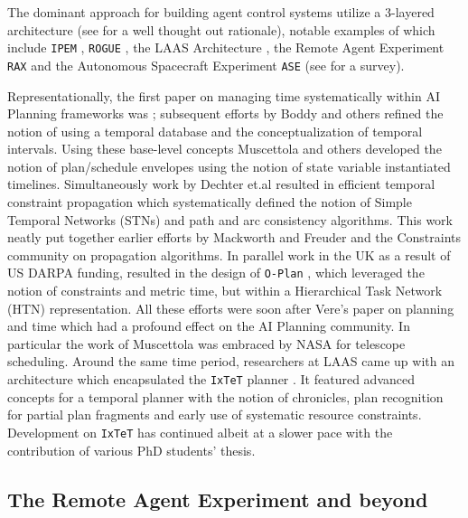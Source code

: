 The dominant approach for building agent control systems utilize a
$3$-layered architecture (see \cite{gat98} for a well thought out
rationale), notable examples of which include \texttt{IPEM}
\cite{AmbrosIngerson88}, \texttt{ROGUE} \cite{Haigh98}, the LAAS
Architecture \cite{alami:1998p820}, the Remote Agent Experiment
\texttt{RAX} \cite{mus98} and the Autonomous Spacecraft Experiment
\texttt{ASE} \cite{chien99} (see \cite{Knight01} for a survey). %

Representationally, the first paper on managing time systematically
within AI Planning frameworks was \cite{dean87}; subsequent efforts by
Boddy and others \cite{Dean88,Boddy93} refined the notion of using a
temporal database and the conceptualization of temporal
intervals. Using these base-level concepts Muscettola and others
\cite{mus92, ghallab94, laborie95, cesta96} developed the notion of
plan/schedule envelopes using the notion of state variable
instantiated timelines. Simultaneously work by Dechter et.al
\cite{dechter91} resulted in efficient temporal constraint propagation
which systematically defined the notion of Simple Temporal Networks
(STNs) and path and arc consistency algorithms. This work neatly put
together earlier efforts by Mackworth and Freuder \cite{mackworth77,
  mack85} and the Constraints community on propagation algorithms. In
parallel work in the UK as a result of US DARPA funding, resulted in
the design of \texttt{O-Plan} \cite{currie91}, which leveraged the
notion of constraints and metric time, but within a Hierarchical Task
Network (HTN) representation. All these efforts were soon after Vere’s
paper on planning and time \cite{vere83} which had a profound effect
on the AI Planning community. In particular the work of Muscettola
\cite{mus94} was embraced by NASA for telescope scheduling. Around the
same time period, researchers at LAAS came up with an architecture
\cite{alami:1998p820} which encapsulated the \texttt{IxTeT} planner
\cite{ghallab94}. It featured advanced concepts for a temporal planner
with the notion of chronicles, plan recognition for partial plan
fragments and early use of systematic resource
constraints. Development on \texttt{IxTeT} has continued albeit at a
slower pace with the contribution of various PhD students’ thesis.

\subsection{The Remote Agent Experiment and beyond}
\label{sec:rabeyond}

